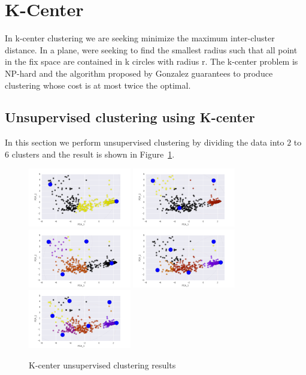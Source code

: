 \documentclass[12pt]{article}
\begin{document}
\section{K-Center}

In k-center clustering we are seeking minimize the maximum inter-cluster distance. In a plane, were seeking to find the smallest radius such that all point in the fix space are contained in k circles with radius r.  The k-center problem is NP-hard and the algorithm proposed by Gonzalez guarantees to produce clustering whose cost is at most twice the optimal.

\subsection{Unsupervised clustering using K-center}

In this section we perform unsupervised clustering by dividing the data into $2$ to $6$ clusters and the result is shown in Figure~\ref{fig:kcenter2}.

\begin{figure}
	\centering
	\includegraphics[width=0.4\textwidth]{m1.png}
	\includegraphics[width=0.4\textwidth]{m2.png}
	\includegraphics[width=0.4\textwidth]{m3.png}
	\includegraphics[width=0.4\textwidth]{m4.png}
	\includegraphics[width=0.4\textwidth]{m5.png}
	\caption{K-center unsupervised clustering results}
	\label{fig:kcenter2}
\end{figure}
\end{document}
